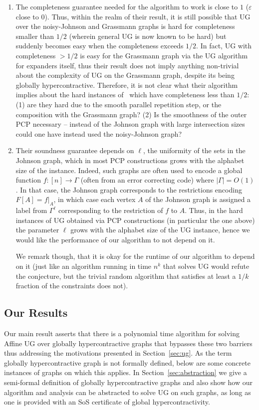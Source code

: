 \documentclass[11pt]{article}
\def \eps {{\varepsilon}}
\theoremstyle{definition}
\begin{document}
\begin{enumerate}
    \item The completeness guarantee needed for the algorithm to work is close to $1$ ($\eps$ close to $0$). Thus, within the realm of their result, it is still possible that UG over the noisy-Johnson and Grassmann graphs is hard for completeness smaller than $1/2$ (wherein 
    general UG is now known to be hard) but suddenly becomes easy when the completeness exceeds $1/2$. In fact, UG with completeness $> 1/2$ is easy for the Grassmann graph via the UG algorithm for expanders itself, thus their result does not imply anything non-trivial about the complexity of UG on the Grassmann graph, despite its being globally hypercontractive. Therefore, it is not
    clear what their algorithm implies about the hard instances of~\cite{DinurKKMS18} which have completeness less than $1/2$: (1) are they hard due to the smooth parallel repetition step, or the composition with the Grassmann graph? (2) Is the smoothness of the outer PCP necessary -- instead of the Johnson graph with large intersection sizes could one have instead used the noisy-Johnson graph?    
    \item Their soundness guarantee depends on $\ell$, the uniformity of the sets in the Johnson graph, which in most PCP constructions grows with the alphabet size of the instance. Indeed, such graphs are often used to encode a global function $f\colon [n]\to\Gamma$ (often from an error correcting code) where $|\Gamma| = O(1)$. 
    In that case, the Johnson graph corresponds to the restrictions encoding
    $F[A] = f|_{A}$, in which case each vertex $A$ of the Johnson graph is 
    assigned a label from $\Gamma^{\ell}$ corresponding to the restriction of 
    $f$ to $A$. Thus, in the hard instances of UG obtained via PCP constructions (in particular the one above) the parameter $\ell$ 
    grows with the alphabet size of the UG instance, hence we would like the performance of our algorithm to not depend on it. 
    
    We remark though, that it is okay for the runtime of our algorithm to depend on it (just like an algorithm 
    running in time $n^{k}$ that solves UG 
    would refute the conjecture, but the trivial random algorithm that satisfies at least a $1/k$ fraction of the constraints does not).
\end{enumerate}

\subsection{Our Results}
Our main result asserts that there is a polynomial time algorithm for solving 
Affine UG over globally hypercontractive graphs that bypasses these 
two barriers thus addressing the motivations presented in Section~\ref{sec:ug}. As the term globally hypercontractive graph is not formally defined, 
below are some concrete instances of graphs on which this applies. In Section~\ref{sec:abstraction} we give a semi-formal definition of globally hypercontractive graphs and also show how our algorithm and analysis can be abstracted to solve UG on such graphs, as long as one is provided with an SoS certificate of global hypercontractivity.
\end{document}
